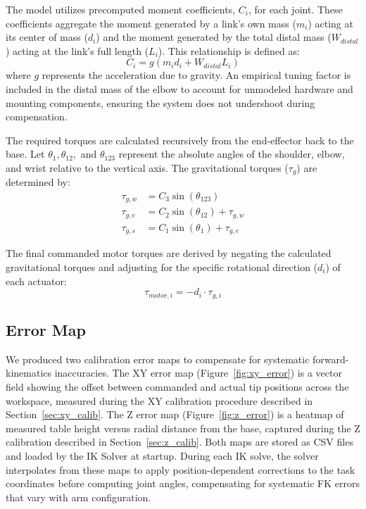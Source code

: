 \noindent The model utilizes precomputed moment coefficients, $C_i$, for each joint. These coefficients aggregate the moment generated by a link's own mass ($m_i$) acting at its center of mass ($d_i$) and the moment generated by the total distal mass ($W_{distal}$) acting at the link's full length ($L_i$). This relationship is defined as:
\begin{equation}
    C_i = g (m_i d_i + W_{distal} L_i)
\end{equation}
where $g$ represents the acceleration due to gravity. An empirical tuning factor is included in the distal mass of the elbow to account for unmodeled hardware and mounting components, ensuring the system does not undershoot during compensation.

\noindent The required torques are calculated recursively from the end-effector back to the base. Let $\theta_1, \theta_{12},$ and $\theta_{123}$ represent the absolute angles of the shoulder, elbow, and wrist relative to the vertical axis. The gravitational torques ($\tau_g$) are determined by:
\begin{align}
    \tau_{g,w} &= C_3 \sin(\theta_{123}) \\
    \tau_{g,e} &= C_2 \sin(\theta_{12}) + \tau_{g,w} \\
    \tau_{g,s} &= C_1 \sin(\theta_1) + \tau_{g,e}
\end{align}

\noindent The final commanded motor torques are derived by negating the calculated gravitational torques and adjusting for the specific rotational direction ($d_i$) of each actuator:
\begin{equation}
    \tau_{motor,i} = -d_i \cdot \tau_{g,i}
\end{equation}

\subsection{Error Map}
We produced two calibration error maps to compensate for systematic forward-kinematics inaccuracies. The XY error map (Figure~\ref{fig:xy_error}) is a vector field showing the offset between commanded and actual tip positions across the workspace, measured during the XY calibration procedure described in Section~\ref{sec:xy_calib}. The Z error map (Figure~\ref{fig:z_error}) is a heatmap of measured table height versus radial distance from the base, captured during the Z calibration described in Section~\ref{sec:z_calib}. Both maps are stored as CSV files and loaded by the IK Solver at startup. During each IK solve, the solver interpolates from these maps to apply position-dependent corrections to the task coordinates before computing joint angles, compensating for systematic FK errors that vary with arm configuration.

